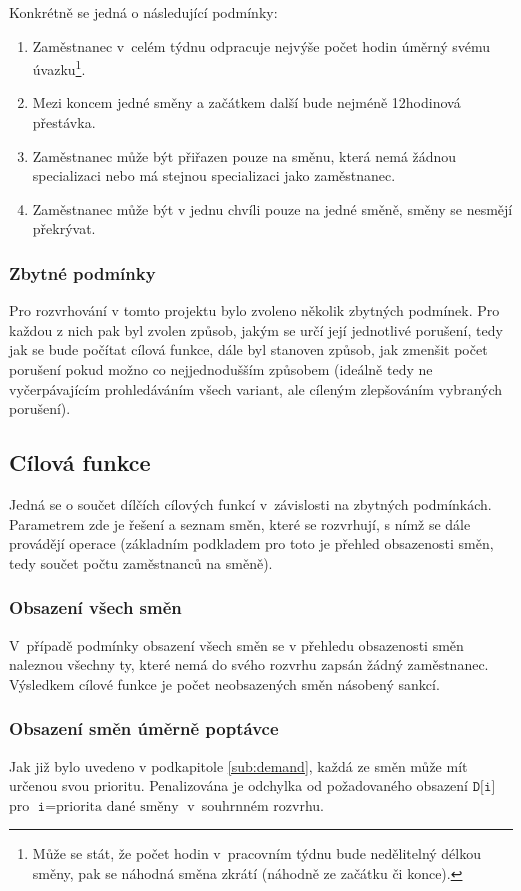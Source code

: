 \documentclass[twoside]{ctuthesis}
\begin{document}
\begin{enumerate}[label=\textbf{O\arabic*.}]
Konkrétně se jedná o následující podmínky:

\begin{enumerate}
	\item Zaměstnanec v~celém týdnu odpracuje nejvýše počet hodin úměrný svému úvazku\footnote{Může se stát, že počet hodin v~pracovním týdnu bude nedělitelný délkou směny, pak se náhodná směna zkrátí (náhodně ze začátku či konce).}.
	\item Mezi koncem jedné směny a začátkem další bude nejméně 12hodinová přestávka.
	\item Zaměstnanec může být přiřazen pouze na směnu, která nemá žádnou specializaci nebo má stejnou specializaci jako zaměstnanec.
	\item Zaměstnanec může být v jednu chvíli pouze na jedné směně, směny se nesmějí překrývat.
\end{enumerate}

\subsubsection{Zbytné podmínky}
Pro rozvrhování v tomto projektu bylo zvoleno několik zbytných podmínek. Pro každou z nich pak byl zvolen způsob, jakým se určí její jednotlivé porušení, tedy jak se bude počítat cílová funkce, dále byl stanoven způsob, jak zmenšit počet porušení pokud možno co nejjednodušším způsobem (ideálně tedy ne vyčerpávajícím prohledáváním všech variant, ale cíleným zlepšováním vybraných porušení).

\subsection{Cílová funkce}
Jedná se o součet dílčích cílových funkcí v~závislosti na zbytných podmínkách. Parametrem zde je řešení a seznam směn, které se rozvrhují, s nímž se dále provádějí operace (základním podkladem pro toto je přehled obsazenosti směn, tedy součet počtu zaměstnanců na směně).

\subsubsection{Obsazení všech směn}
V~případě podmínky obsazení všech směn se v přehledu obsazenosti směn naleznou všechny ty, které nemá do svého rozvrhu zapsán žádný zaměstnanec. Výsledkem cílové funkce je počet neobsazených směn násobený sankcí.

\subsubsection{Obsazení směn úměrně poptávce}
Jak již bylo uvedeno v podkapitole \ref{sub:demand}, každá ze směn může mít určenou svou prioritu. Penalizována je odchylka od požadovaného obsazení $\texttt{D[i]}$ pro $\texttt{i} = \mbox{priorita dané směny}$ v~souhrnném rozvrhu.


\end{enumerate}
\end{document}
